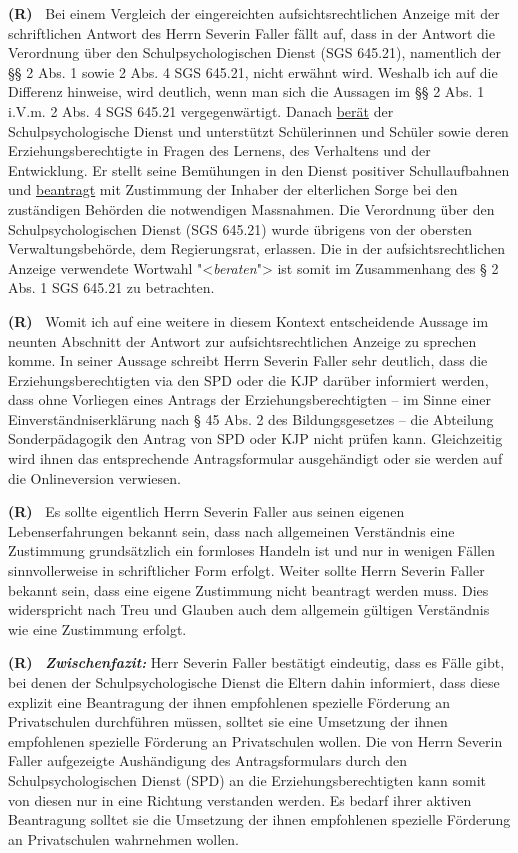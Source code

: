 \documentclass[paper=a4,fontsize=12pt, oneside, numbers=noenddot]{scrbook}
\newcounter{rz}
\newcommand{\Rz}{
	\addtocounter{rz}{1}\textbf{(R\arabic{rz})~}
}
\newcommand{\RzLabel}[1]{
	\refstepcounter{rz}\label{#1}\textbf{(R\arabic{rz})~}
}
\begin{document}
\Rz Bei einem Vergleich der eingereichten aufsichtsrechtlichen Anzeige mit der schriftlichen Antwort des Herrn Severin Faller fällt auf, dass in der Antwort die  Verordnung über den Schulpsychologischen Dienst (SGS 645.21), namentlich der §§ 2 Abs. 1 sowie 2 Abs. 4 SGS 645.21, nicht erwähnt wird. Weshalb ich auf die Differenz hinweise, wird deutlich, wenn man sich die Aussagen im §§ 2 Abs. 1 i.V.m. 2 Abs. 4 SGS 645.21 vergegenwärtigt. Danach \underline{berät} der Schulpsychologische Dienst und unterstützt Schülerinnen und Schüler sowie deren Erziehungsberechtigte in Fragen des Lernens, des Verhaltens und der Entwicklung. Er stellt seine Bemühungen in den Dienst positiver Schullaufbahnen und \underline{beantragt} mit Zustimmung der Inhaber der elterlichen Sorge bei den zuständigen Behörden die notwendigen Massnahmen. Die Verordnung über den Schulpsychologischen Dienst (SGS 645.21) wurde übrigens von der obersten Verwaltungsbehörde, dem Regierungsrat, erlassen. Die in der aufsichtsrechtlichen Anzeige verwendete Wortwahl "<\textit{beraten}"> ist somit im Zusammenhang des § 2 Abs. 1 SGS 645.21 zu betrachten.


\RzLabel{Beantragung4Zustimmung} Womit ich auf eine weitere in diesem Kontext entscheidende Aussage im neunten Abschnitt der Antwort zur aufsichtsrechtlichen Anzeige zu sprechen komme. In seiner Aussage schreibt Herrn Severin Faller sehr deutlich, dass die Erziehungsberechtigten via den SPD oder die KJP darüber informiert werden, dass ohne Vorliegen eines Antrags der Erziehungsberechtigten -- im Sinne einer Einverständniserklärung nach § 45 Abs. 2 des Bildungsgesetzes -- die Abteilung Sonderpädagogik den Antrag von SPD oder KJP nicht prüfen kann. Gleichzeitig wird ihnen das entsprechende Antragsformular ausgehändigt oder sie werden auf die Onlineversion verwiesen. 

\Rz Es sollte eigentlich Herrn Severin Faller aus seinen eigenen Lebenserfahrungen bekannt sein, dass nach allgemeinen Verständnis eine Zustimmung grundsätzlich ein formloses Handeln ist und nur in wenigen Fällen sinnvollerweise in schriftlicher Form erfolgt. Weiter sollte Herrn Severin Faller bekannt sein, dass eine eigene Zustimmung nicht beantragt werden muss. Dies widerspricht nach Treu und Glauben auch dem allgemein gültigen Verständnis wie eine Zustimmung erfolgt.

\RzLabel{ZwischenfazitSF2} \textit{\textbf{Zwischenfazit:}} Herr Severin Faller bestätigt eindeutig, dass es Fälle gibt, bei denen der Schulpsychologische Dienst die Eltern dahin informiert, dass diese explizit eine Beantragung der ihnen empfohlenen spezielle Förderung an Privatschulen durchführen müssen, solltet sie eine Umsetzung der ihnen empfohlenen spezielle Förderung an Privatschulen wollen. Die von Herrn Severin Faller aufgezeigte Aushändigung des Antragsformulars durch den Schulpsychologischen Dienst (SPD) an die Erziehungsberechtigten kann somit von diesen nur in eine Richtung verstanden werden. Es bedarf ihrer aktiven Beantragung solltet sie die Umsetzung der ihnen empfohlenen spezielle Förderung an Privatschulen wahrnehmen wollen. 
\end{document}
